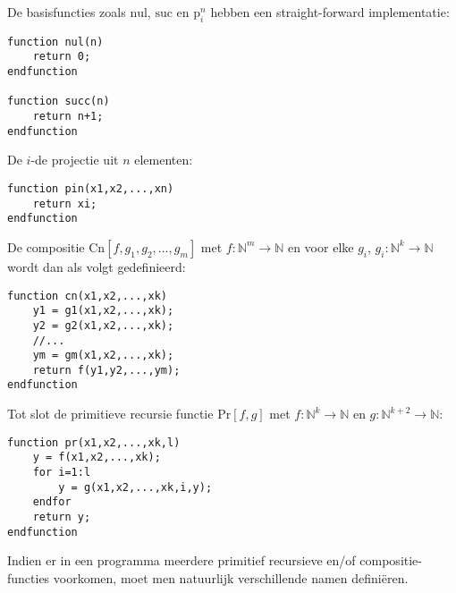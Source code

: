 \documentclass[fleqn]{article}
\newcommand{\NN}{\ensuremath{\mathbb{N}}}
\begin{document}
\begin{answer}
De basisfuncties zoals $\mbox{nul}$, $\mbox{suc}$ en $\mbox{p}_i^n$ hebben een straight-forward implementatie:
\begin{verbatim}
function nul(n)
    return 0;
endfunction

function succ(n)
    return n+1;
endfunction
\end{verbatim}
De $i$-de projectie uit $n$ elementen:
\begin{verbatim}
function pin(x1,x2,...,xn)
    return xi;
endfunction
\end{verbatim}
De compositie $\mbox{Cn}\left[f,g_1,g_2,\ldots,g_m\right]$ met $f:\NN^m\rightarrow\NN$ en voor elke $g_i$, $g_i:\NN^k\rightarrow\NN$ wordt dan als volgt gedefinieerd:
\begin{verbatim}
function cn(x1,x2,...,xk)
    y1 = g1(x1,x2,...,xk);
    y2 = g2(x1,x2,...,xk);
    //...
    ym = gm(x1,x2,...,xk);
    return f(y1,y2,...,ym);
endfunction
\end{verbatim}
Tot slot de primitieve recursie functie $\mbox{Pr}\left[f,g\right]$ met $f:\NN^k\rightarrow\NN$ en $g:\NN^{k+2}\rightarrow\NN$:
\begin{verbatim}
function pr(x1,x2,...,xk,l)
    y = f(x1,x2,...,xk);
    for i=1:l
        y = g(x1,x2,...,xk,i,y);
    endfor
    return y;
endfunction
\end{verbatim}
\end{answer}
Indien er in een programma meerdere primitief recursieve en/of compositie-functies voorkomen, moet men natuurlijk verschillende namen defini\"eren.
\end{document}
